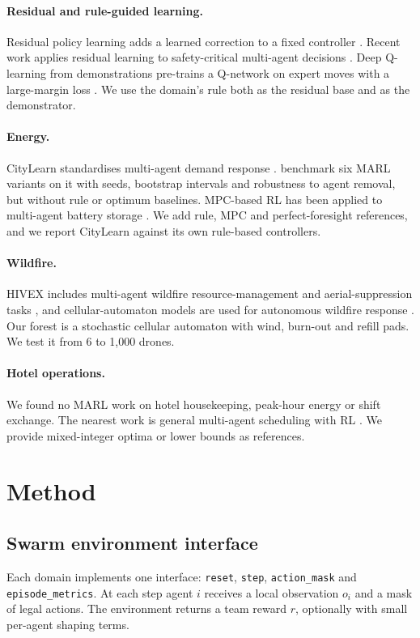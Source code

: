 \documentclass[11pt]{article}
\begin{document}
\paragraph{Residual and rule-guided learning.} Residual policy learning adds a learned correction to a fixed controller \citep{silver2018residual,johannink2019residual}. Recent work applies residual learning to safety-critical multi-agent decisions \citep{residualsafe2025}. Deep Q-learning from demonstrations pre-trains a Q-network on expert moves with a large-margin loss \citep{hester2018dqfd}. We use the domain's rule both as the residual base and as the demonstrator.

\paragraph{Energy.} CityLearn standardises multi-agent demand response \citep{vazquez2020citylearn}. \citet{khouja2026citylearnmarl} benchmark six MARL variants on it with seeds, bootstrap intervals and robustness to agent removal, but without rule or optimum baselines. MPC-based RL has been applied to multi-agent battery storage \citep{mpcrlbattery2021}. We add rule, MPC and perfect-foresight references, and we report CityLearn against its own rule-based controllers.

\paragraph{Wildfire.} HIVEX includes multi-agent wildfire resource-management and aerial-suppression tasks \citep{siedler2025hivex}, and cellular-automaton models are used for autonomous wildfire response \citep{warpca2024}. Our forest is a stochastic cellular automaton with wind, burn-out and refill pads. We test it from 6 to 1{,}000 drones.

\paragraph{Hotel operations.} We found no MARL work on hotel housekeeping, peak-hour energy or shift exchange. The nearest work is general multi-agent scheduling with RL \citep{flexsched2022}. We provide mixed-integer optima or lower bounds as references.

\section{Method}

\subsection{Swarm environment interface}
Each domain implements one interface: \texttt{reset}, \texttt{step}, \texttt{action\_mask} and \texttt{episode\_metrics}. At each step agent $i$ receives a local observation $o_i$ and a mask of legal actions. The environment returns a team reward $r$, optionally with small per-agent shaping terms.
\end{document}
